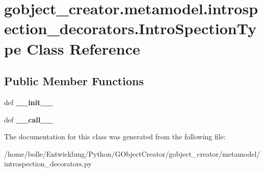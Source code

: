 \hypertarget{classgobject__creator_1_1metamodel_1_1introspection__decorators_1_1IntroSpectionType}{
\section{gobject\_\-creator.metamodel.introspection\_\-decorators.IntroSpectionType Class Reference}
\label{classgobject__creator_1_1metamodel_1_1introspection__decorators_1_1IntroSpectionType}
}
\subsection*{Public Member Functions}
\begin{DoxyCompactItemize}
\item 
\hypertarget{classgobject__creator_1_1metamodel_1_1introspection__decorators_1_1IntroSpectionType_ab57189cd47e23d2061536ba6e8c965af}{
def {\bfseries \_\-\_\-init\_\-\_\-}}
\label{classgobject__creator_1_1metamodel_1_1introspection__decorators_1_1IntroSpectionType_ab57189cd47e23d2061536ba6e8c965af}

\item 
\hypertarget{classgobject__creator_1_1metamodel_1_1introspection__decorators_1_1IntroSpectionType_a5b378109503925a2a32f207279e2355f}{
def {\bfseries \_\-\_\-call\_\-\_\-}}
\label{classgobject__creator_1_1metamodel_1_1introspection__decorators_1_1IntroSpectionType_a5b378109503925a2a32f207279e2355f}

\end{DoxyCompactItemize}


The documentation for this class was generated from the following file:\begin{DoxyCompactItemize}
\item 
/home/bolle/Entwicklung/Python/GObjectCreator/gobject\_\-creator/metamodel/introspection\_\-decorators.py\end{DoxyCompactItemize}
